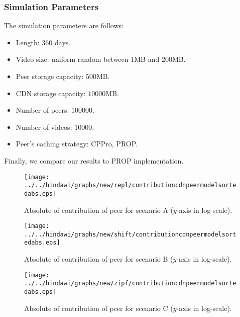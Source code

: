 \subsubsection{Simulation Parameters}
The simulation parameters are follows:
\begin{itemize}
\item Length: $360$ days.
\item Video size: uniform random between $1$MB and $200$MB.
\item Peer storage capacity: $500$MB.
\item CDN storage capacity: $10000$MB.
\item Number of peers: $100000$.
\item Number of videos: $10000$.
\item Peer's caching strategy: CPPro, PROP.
\end{itemize}
Finally, we compare our results to PROP \cite{1613869} implementation.


\begin{figure}[!t]
\begin{center}
\texttt{[image: ../../hindawi/graphs/new/repl/contributioncdnpeermodelsortedabs.eps]}
\end{center}
\caption{Absolute of contribution of peer for scenario A ($y$-axis in log-scale).}
\label{fig:contrib-normal}
\end{figure}


\begin{figure}[!t]
\begin{center}
\texttt{[image: ../../hindawi/graphs/new/shift/contributioncdnpeermodelsortedabs.eps]}
\end{center}
\caption{Absolute of contribution of peer for scenario B ($y$-axis in log-scale).}
\label{fig:contrib-shift}
\end{figure}


\begin{figure}[!t]
\begin{center}
\texttt{[image: ../../hindawi/graphs/new/zipf/contributioncdnpeermodelsortedabs.eps]}
\end{center}
\caption{Absolute of contribution of peer for scenario C ($y$-axis in log-scale).}
\label{fig:contrib-zipf}
\end{figure}





